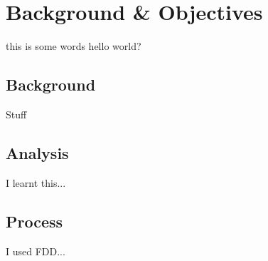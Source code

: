 

\section{Background \& Objectives}

this is some words
hello world?

\subsection{Background}
Stuff

\subsection{Analysis}
I learnt this...

\subsection{Process}
I used FDD...